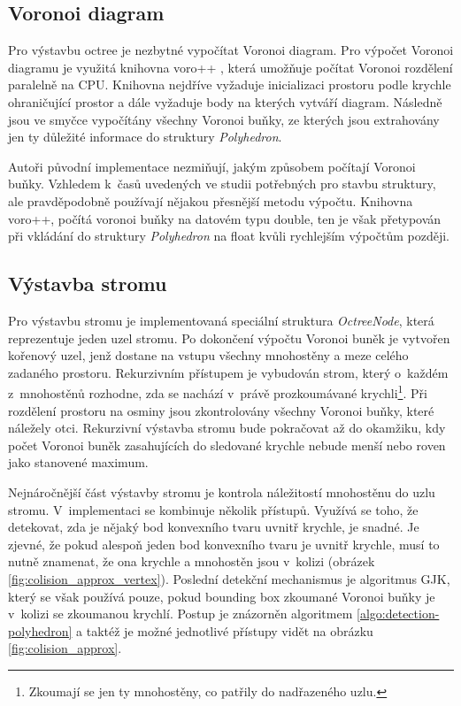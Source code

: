 \subsection*{Voronoi diagram}
\label{Voroni_imp}
Pro výstavbu octree je nezbytné vypočítat Voronoi diagram. Pro výpočet Voronoi diagramu je využitá knihovna voro++ \cite{voro,voro_para}, která umožňuje počítat Voronoi rozdělení paralelně na CPU. Knihovna nejdříve vyžaduje inicializaci prostoru podle krychle ohraničující prostor a dále vyžaduje body na kterých vytváří diagram. Následně jsou ve smyčce vypočítány všechny Voronoi buňky, ze kterých jsou extrahovány jen ty důležité informace do struktury \emph{Polyhedron}.

 Autoři původní implementace nezmiňují, jakým způsobem počítají Voronoi buňky. Vzhledem k~časů uvedených ve studii potřebných pro stavbu struktury, ale pravděpodobně používají nějakou přesnější metodu výpočtu. Knihovna voro++, počítá voronoi buňky na datovém typu double, ten je však přetypován při vkládání do struktury \emph{Polyhedron} na float kvůli rychlejším výpočtům později.

\subsection*{Výstavba stromu}

Pro výstavbu stromu je implementovaná speciální struktura \emph{OctreeNode}, která reprezentuje jeden uzel stromu. Po dokončení výpočtu Voronoi buněk je vytvořen kořenový uzel, jenž dostane na vstupu všechny mnohostěny a meze celého zadaného prostoru. Rekurzivním přístupem je vybudován strom, který o~každém z~mnohostěnů rozhodne, zda se nachází v~právě prozkoumávané krychli\footnote{Zkoumají se jen ty mnohostěny, co patřily do nadřazeného uzlu.}. Při rozdělení prostoru na osminy jsou zkontrolovány všechny Voronoi buňky, které náležely otci. Rekurzivní výstavba stromu bude pokračovat až do okamžiku, kdy počet Voronoi buněk zasahujících do sledované krychle nebude menší nebo roven jako stanovené maximum.

Nejnáročnější část výstavby stromu je kontrola náležitostí mnohostěnu do uzlu stromu. V~implementaci se kombinuje několik přístupů. Využívá se toho, že detekovat, zda je nějaký bod konvexního tvaru uvnitř krychle, je snadné. Je zjevné, že pokud alespoň jeden bod konvexního tvaru je uvnitř krychle, musí to nutně znamenat, že ona krychle a mnohostěn jsou v~kolizi (obrázek \ref{fig:colision_approx_vertex}). Poslední detekční mechanismus je algoritmus GJK, který se však používá pouze, pokud bounding box zkoumané Voronoi buňky je v~kolizi se zkoumanou krychlí. Postup je znázorněn algoritmem \ref{algo:detection-polyhedron} a taktéž je možné jednotlivé přístupy vidět na obrázku \ref{fig:colision_approx}.

